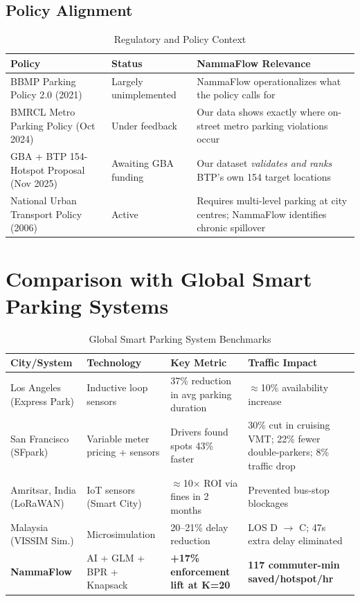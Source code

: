 \documentclass[12pt,a4paper]{article}
\begin{document}
\subsection{Policy Alignment}

\begin{table}[H]
\centering
\caption{Regulatory and Policy Context}
\begin{tabular}{p{5.5cm}p{2.5cm}p{5cm}}
\toprule
\textbf{Policy} & \textbf{Status} & \textbf{NammaFlow Relevance} \\
\midrule
BBMP Parking Policy 2.0 (2021) & Largely unimplemented & NammaFlow operationalizes what the policy calls for \\
BMRCL Metro Parking Policy (Oct 2024) & Under feedback & Our data shows exactly where on-street metro parking violations occur \\
GBA + BTP 154-Hotspot Proposal (Nov 2025) & Awaiting GBA funding & Our dataset \textit{validates and ranks} BTP's own 154 target locations \\
National Urban Transport Policy (2006) & Active & Requires multi-level parking at city centres; NammaFlow identifies chronic spillover \\
\bottomrule
\end{tabular}
\end{table}

\section{Comparison with Global Smart Parking Systems}

\begin{table}[H]
\centering
\caption{Global Smart Parking System Benchmarks}
\small
\begin{tabular}{p{2.5cm}p{3.5cm}p{3.5cm}p{3.5cm}}
\toprule
\textbf{City/System} & \textbf{Technology} & \textbf{Key Metric} & \textbf{Traffic Impact} \\
\midrule
Los Angeles (Express Park) & Inductive loop sensors & 37\% reduction in avg parking duration & $\approx$10\% availability increase \\
San Francisco (SFpark) & Variable meter pricing + sensors & Drivers found spots 43\% faster & 30\% cut in cruising VMT; 22\% fewer double-parkers; 8\% traffic drop \\
Amritsar, India (LoRaWAN) & IoT sensors (Smart City) & $\approx$10$\times$ ROI via fines in 2 months & Prevented bus-stop blockages \\
Malaysia (VISSIM Sim.) & Microsimulation & 20--21\% delay reduction & LOS D $\to$ C; 47s extra delay eliminated \\
\midrule
\textbf{NammaFlow} & AI + GLM + BPR + Knapsack & \textbf{+17\% enforcement lift at K=20} & \textbf{117 commuter-min saved/hotspot/hr} \\
\bottomrule
\end{tabular}
\end{table}
\end{document}
